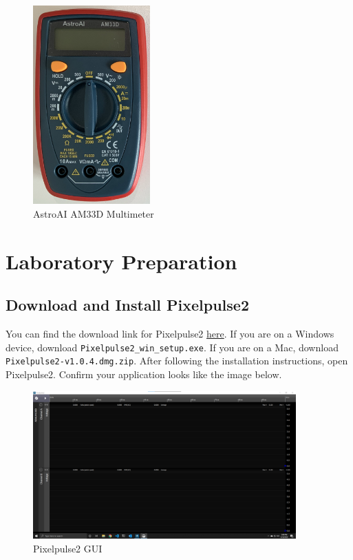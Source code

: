 \documentclass[12pt]{../manual}
\begin{document}
\begin{figure}[ht!]
\begin{center}
\includegraphics[width=0.4\textwidth]{figures/multimeter.png}
\caption[AstroAI AM33D Multimeter]{AstroAI AM33D Multimeter}
\label{fig:multimeter}
\end{center}
\end{figure}

\newpage
\section{Laboratory Preparation}
\subsection{Download and Install Pixelpulse2}
You can find the download link for Pixelpulse2 \href{https://github.com/analogdevicesinc/Pixelpulse2/releases/tag/v1.0.4}{here}. If you are on a Windows device, download {\tt Pixelpulse2\_win\_setup.exe}. If you are on a Mac, download {\tt Pixelpulse2-v1.0.4.dmg.zip}. After following the installation instructions, open Pixelpulse2. Confirm your application looks like the image below.

\begin{figure}[ht!]
\begin{center}
\includegraphics[width=0.9\textwidth]{figures/Pixelpulse2.png}
\caption[Pixelpulse2 GUI]{Pixelpulse2 GUI}
\label{fig:pixelpulse2}
\end{center}
\end{figure}
\end{document}
